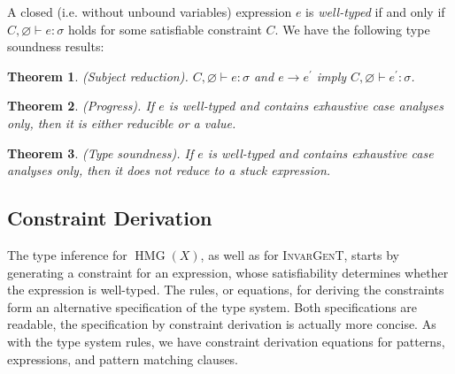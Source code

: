 \documentclass{article}
\newcommand{\tmem}[1]{{\em #1\/}}
\newcommand{\tmname}[1]{\textsc{#1}}
\newcommand{\tmop}[1]{\ensuremath{\operatorname{#1}}}
\newtheorem{theorem}{Theorem}
\begin{document}
A closed (i.e. without unbound variables) expression $e$ is
{\tmem{well-typed}} if and only if $C, \varnothing \vdash e : \sigma$ holds
for some satisfiable constraint $C$. We have the following type soundness
results:

\begin{theorem}
  {\tmem{(Subject reduction).}} $C, \varnothing \vdash e : \sigma$ and $e
  \rightarrow e^{\prime}$ imply $C, \varnothing \vdash e^{\prime} : \sigma$.
\end{theorem}

\begin{theorem}
  {\tmem{(Progress).}} If $e$ is well-typed and contains exhaustive case
  analyses only, then it is either reducible or a value.
\end{theorem}

\begin{theorem}
  {\tmem{(Type soundness).}} If $e$ is well-typed and contains exhaustive case
  analyses only, then it does not reduce to a stuck
  expression.\label{HMGSoundness}
\end{theorem}

\subsection{Constraint Derivation}

The type inference for $\tmop{HMG} (X)$, as well as for {\tmname{InvarGenT}},
starts by generating a constraint for an expression, whose satisfiability
determines whether the expression is well-typed. The rules, or equations, for
deriving the constraints form an alternative specification of the type system.
Both specifications are readable, the specification by constraint derivation
is actually more concise. As with the type system rules, we have constraint
derivation equations for patterns, expressions, and pattern matching clauses.
\end{document}

